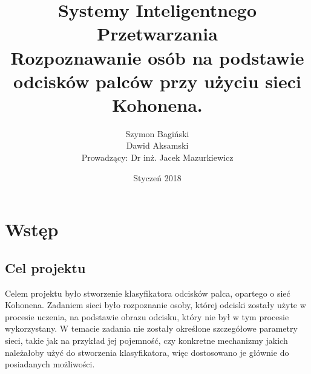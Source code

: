 \documentclass[12pt, notitlepage]{article}
\begin{document}
\begin{titlepage}
    \thispagestyle{empty}
    \title{\textbf{
        \Huge Systemy Inteligentnego Przetwarzania \\
        [1cm]
        \LARGE Rozpoznawanie osób na podstawie odcisków palców przy użyciu sieci Kohonena. 
    }}
    \author{
        Szymon Bagiński \\ 
        Dawid Aksamski \\
        [1cm]
        {\small Prowadzący: Dr inż. Jacek Mazurkiewicz}
    }
    \date{Styczeń 2018}
    \maketitle
    \vfill
    \vfill
\end{titlepage}    


\tableofcontents

\newpage
\section{Wstęp}

\subsection{Cel projektu}

Celem projektu było stworzenie klasyfikatora odcisków palca, opartego o sieć Kohonena\cite{Kohonen}. Zadaniem sieci było rozpoznanie osoby, której odciski zostały użyte w procesie uczenia, na podstawie obrazu odcisku, który nie był w tym procesie wykorzystany. W temacie zadania nie zostały określone szczegółowe parametry sieci, takie jak na przykład jej pojemność, czy konkretne mechanizmy jakich należałoby użyć do stworzenia klasyfikatora, więc dostosowano je głównie do posiadanych możliwości.
\end{document}
